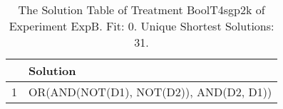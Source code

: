 \begin{table}[ht]
\centering
\begin{tabular}{rp{9cm}}
  \hline
 & Solution \\ 
  \hline
1 & OR(AND(NOT(D1), NOT(D2)), AND(D2, D1)) \\ 
   \hline
\end{tabular}
\caption{The Solution Table of Treatment BoolT4sgp2k of Experiment ExpB. Fit: 0. Unique Shortest Solutions: 31.} 
\end{table}

